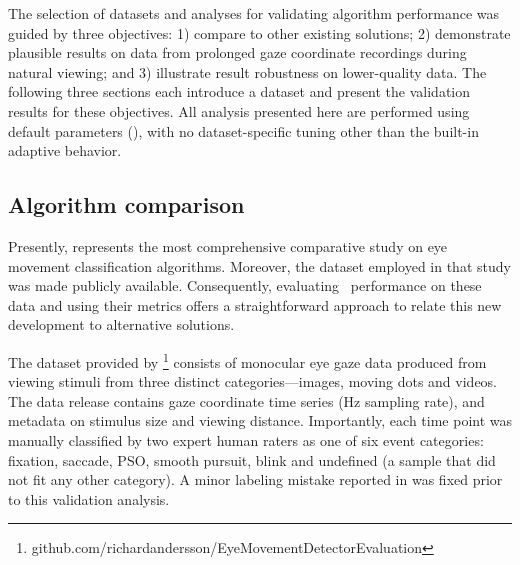 
The selection of datasets and analyses for validating algorithm performance was
guided by three objectives: 1) compare to other existing
solutions; 2) demonstrate plausible results on data from prolonged gaze
coordinate recordings during natural viewing; and 3) illustrate result
robustness on lower-quality data. The following three sections each introduce a
dataset and present the validation results for these objectives.  All analysis
presented here are performed using default parameters (), with
no dataset-specific tuning other than the built-in adaptive behavior.


\subsection*{Algorithm comparison}\label{ana_1}

Presently, \cite{Andersson2017} represents the most comprehensive comparative
study on eye movement classification algorithms. Moreover, the dataset employed
in that study was made publicly available. Consequently, evaluating \remodnav\
performance on these data and using their metrics offers a straightforward
approach to relate this new development to alternative solutions.

The dataset provided by
\cite{Andersson2017}\footnote{github.com/richardandersson/EyeMovementDetector\linebreak[0]Evaluation}
consists of monocular eye gaze data produced from viewing stimuli from three
distinct categories---images, moving dots and videos. The data release contains
gaze coordinate time series (\unit[500]{Hz} sampling rate), and metadata on
stimulus size and viewing distance.  Importantly, each time point was manually
classified by two expert human raters as one of six event categories: fixation,
saccade, PSO, smooth pursuit, blink and undefined (a sample that did not fit
any other category). A minor labeling mistake reported in \cite{Zemblys2018}
was fixed prior to this validation analysis.

